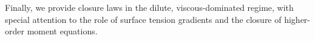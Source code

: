 Finally, we provide closure laws in the dilute, viscous-dominated regime, with special attention to the role of surface tension gradients and the closure of higher-order moment equations.%



